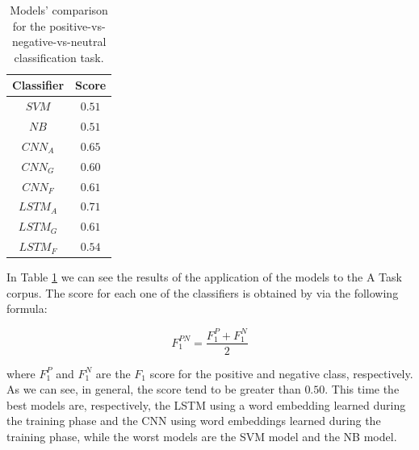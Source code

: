 \documentclass[11pt,twocolumn]{article}
\begin{document}
            \begin{table}[h]
                \centering
                \begin{tabular}{| c | c |}
                    \hline
                    \textbf{Classifier} & \textbf{Score} \\
                    \hline
                    $SVM$ & $0.51$ \\
                    \hline
                    $NB$ & $0.51$ \\
                    \hline
                    $CNN_A$ & $0.65$ \\
                    \hline
                    $CNN_G$ & $0.60$ \\
                    \hline
                    $CNN_F$ & $0.61$ \\
                    \hline
                    $LSTM_A$ & $0.71$ \\
                    \hline
                    $LSTM_G$ & $0.61$ \\
                    \hline
                    $LSTM_F$ & $0.54$ \\
                    \hline
                \end{tabular}
                \caption{Models' comparison for the positive-vs-negative-vs-neutral classification task.}
                \label{tab:a_comparison}
            \end{table}

            \noindent
            In Table \ref{tab:a_comparison} we can see the results of the application of the models to the A Task
            corpus. The score for each one of the classifiers is obtained by via the following formula:

            \begin{equation*}
                F_1^{PN} = \frac{F_1^P + F_1^N}{2}
            \end{equation*}

            \noindent
            where $F_1^P$ and $F_1^N$ are the $F_1$ score for the positive and negative class, respectively.
            As we can see, in general, the score tend to be greater
            than $0.50$. This time the best models are, respectively, the LSTM using a word embedding learned
            during the training phase and the CNN using word embeddings learned during the training phase, while
            the worst models are the SVM model and the NB model.
\end{document}

